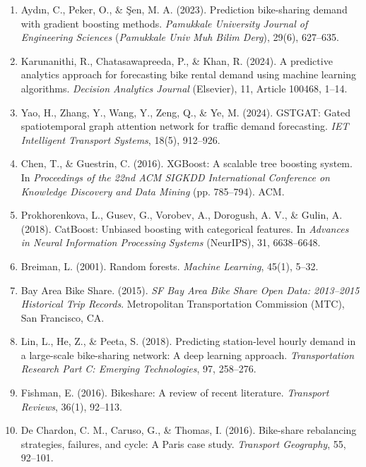 \documentclass[12pt, a4paper]{article}
\renewcommand{\_}{\textunderscore\allowbreak}
\begin{document}
\begin{enumerate}
    \item Ayd{\i}n, C., Peker, O., \& {\c{S}}en, M. A. (2023). Prediction bike-sharing demand with gradient boosting methods. \textit{Pamukkale University Journal of Engineering Sciences} (\textit{Pamukkale Univ Muh Bilim Derg}), 29(6), 627--635.
    
    \item Karunanithi, R., Chatasawapreeda, P., \& Khan, R. (2024). A predictive analytics approach for forecasting bike rental demand using machine learning algorithms. \textit{Decision Analytics Journal} (Elsevier), 11, Article 100468, 1--14.
    
    \item Yao, H., Zhang, Y., Wang, Y., Zeng, Q., \& Ye, M. (2024). GSTGAT: Gated spatiotemporal graph attention network for traffic demand forecasting. \textit{IET Intelligent Transport Systems}, 18(5), 912--926.
    
    \item Chen, T., \& Guestrin, C. (2016). XGBoost: A scalable tree boosting system. In \textit{Proceedings of the 22nd ACM SIGKDD International Conference on Knowledge Discovery and Data Mining} (pp. 785--794). ACM.
    
    \item Prokhorenkova, L., Gusev, G., Vorobev, A., Dorogush, A. V., \& Gulin, A. (2018). CatBoost: Unbiased boosting with categorical features. In \textit{Advances in Neural Information Processing Systems} (NeurIPS), 31, 6638--6648.
    
    \item Breiman, L. (2001). Random forests. \textit{Machine Learning}, 45(1), 5--32.
    
    \item Bay Area Bike Share. (2015). \textit{SF Bay Area Bike Share Open Data: 2013--2015 Historical Trip Records}. Metropolitan Transportation Commission (MTC), San Francisco, CA.
    
    \item Lin, L., He, Z., \& Peeta, S. (2018). Predicting station-level hourly demand in a large-scale bike-sharing network: A deep learning approach. \textit{Transportation Research Part C: Emerging Technologies}, 97, 258--276.
    
    \item Fishman, E. (2016). Bikeshare: A review of recent literature. \textit{Transport Reviews}, 36(1), 92--113.
    
    \item De Chardon, C. M., Caruso, G., \& Thomas, I. (2016). Bike-share rebalancing strategies, failures, and cycle: A Paris case study. \textit{Transport Geography}, 55, 92--101.
    

\end{enumerate}
\end{document}
